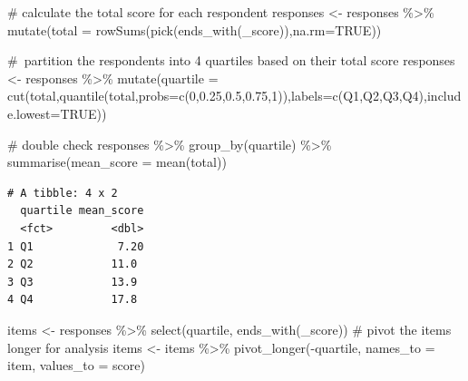 \documentclass[
  letterpaper,
  DIV=11,
  numbers=noendperiod]{scrreprt}
\newenvironment{Shaded}{\begin{snugshade}}{\end{snugshade}}
\newcommand{\AttributeTok}[1]{\textcolor[rgb]{0.40,0.45,0.13}{#1}}
\newcommand{\CommentTok}[1]{\textcolor[rgb]{0.37,0.37,0.37}{#1}}
\newcommand{\ConstantTok}[1]{\textcolor[rgb]{0.56,0.35,0.01}{#1}}
\newcommand{\DecValTok}[1]{\textcolor[rgb]{0.68,0.00,0.00}{#1}}
\newcommand{\FloatTok}[1]{\textcolor[rgb]{0.68,0.00,0.00}{#1}}
\newcommand{\FunctionTok}[1]{\textcolor[rgb]{0.28,0.35,0.67}{#1}}
\newcommand{\NormalTok}[1]{\textcolor[rgb]{0.00,0.23,0.31}{#1}}
\newcommand{\OtherTok}[1]{\textcolor[rgb]{0.00,0.23,0.31}{#1}}
\newcommand{\SpecialCharTok}[1]{\textcolor[rgb]{0.37,0.37,0.37}{#1}}
\newcommand{\StringTok}[1]{\textcolor[rgb]{0.13,0.47,0.30}{#1}}
\begin{document}
\begin{Shaded}
\begin{Highlighting}[]
\CommentTok{\# calculate the total score for each respondent}
\NormalTok{responses }\OtherTok{\textless{}{-}}\NormalTok{ responses }\SpecialCharTok{\%\textgreater{}\%} 
  \FunctionTok{mutate}\NormalTok{(}\AttributeTok{total =} \FunctionTok{rowSums}\NormalTok{(}\FunctionTok{pick}\NormalTok{(}\FunctionTok{ends\_with}\NormalTok{(}\StringTok{\textquotesingle{}\_score\textquotesingle{}}\NormalTok{)),}\AttributeTok{na.rm=}\ConstantTok{TRUE}\NormalTok{)) }

\CommentTok{\# partition the respondents into 4 quartiles based on their total score}
\NormalTok{responses }\OtherTok{\textless{}{-}}\NormalTok{ responses }\SpecialCharTok{\%\textgreater{}\%} 
  \FunctionTok{mutate}\NormalTok{(}\AttributeTok{quartile =} \FunctionTok{cut}\NormalTok{(total,}\FunctionTok{quantile}\NormalTok{(total,}\AttributeTok{probs=}\FunctionTok{c}\NormalTok{(}\DecValTok{0}\NormalTok{,}\FloatTok{0.25}\NormalTok{,}\FloatTok{0.5}\NormalTok{,}\FloatTok{0.75}\NormalTok{,}\DecValTok{1}\NormalTok{)),}\AttributeTok{labels=}\FunctionTok{c}\NormalTok{(}\StringTok{\textquotesingle{}Q1\textquotesingle{}}\NormalTok{,}\StringTok{\textquotesingle{}Q2\textquotesingle{}}\NormalTok{,}\StringTok{\textquotesingle{}Q3\textquotesingle{}}\NormalTok{,}\StringTok{\textquotesingle{}Q4\textquotesingle{}}\NormalTok{),}\AttributeTok{include.lowest=}\ConstantTok{TRUE}\NormalTok{))}

\CommentTok{\# double check}
\NormalTok{responses }\SpecialCharTok{\%\textgreater{}\%} 
  \FunctionTok{group\_by}\NormalTok{(quartile) }\SpecialCharTok{\%\textgreater{}\%} 
  \FunctionTok{summarise}\NormalTok{(}\AttributeTok{mean\_score =} \FunctionTok{mean}\NormalTok{(total))}
\end{Highlighting}
\end{Shaded}

\begin{verbatim}
# A tibble: 4 x 2
  quartile mean_score
  <fct>         <dbl>
1 Q1             7.20
2 Q2            11.0 
3 Q3            13.9 
4 Q4            17.8 
\end{verbatim}

\begin{Shaded}
\begin{Highlighting}[]
\NormalTok{items }\OtherTok{\textless{}{-}}\NormalTok{ responses }\SpecialCharTok{\%\textgreater{}\%} \FunctionTok{select}\NormalTok{(quartile, }\FunctionTok{ends\_with}\NormalTok{(}\StringTok{\textquotesingle{}\_score\textquotesingle{}}\NormalTok{))}
\CommentTok{\# pivot the items longer for analysis}
\NormalTok{items }\OtherTok{\textless{}{-}}\NormalTok{ items }\SpecialCharTok{\%\textgreater{}\%} \FunctionTok{pivot\_longer}\NormalTok{(}\SpecialCharTok{{-}}\NormalTok{quartile, }\AttributeTok{names\_to =} \StringTok{\textquotesingle{}item\textquotesingle{}}\NormalTok{, }\AttributeTok{values\_to =} \StringTok{\textquotesingle{}score\textquotesingle{}}\NormalTok{)}
\end{Highlighting}
\end{Shaded}
\end{document}
